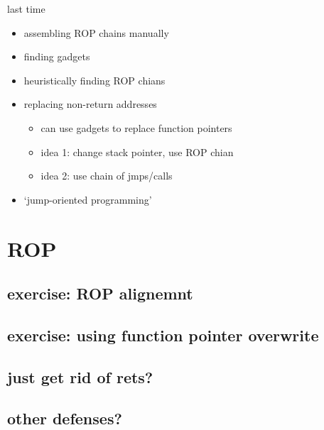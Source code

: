 \date{}
\title{}
\date{}

\begin{frame}
    \titlepage
\end{frame}


\usetikzlibrary{arrows.meta,patterns}

\begin{frame}{last time}
    \begin{itemize}
    \item assembling ROP chains manually
    \item finding gadgets
    \item heuristically finding ROP chians
    \vspace{.5cm}
    \item replacing non-return addresses
        \begin{itemize}
        \item can use gadgets to replace function pointers
        \item idea 1: change stack pointer, use ROP chian
        \item idea 2: use chain of jmps/calls
        \end{itemize}
    \item `jump-oriented programming'
    \end{itemize}
\end{frame}

\section{ROP}
\subsection{exercise: ROP alignemnt}


\subsection{exercise: using function pointer overwrite}


\subsection{just get rid of rets?}


\subsection{other defenses?}


